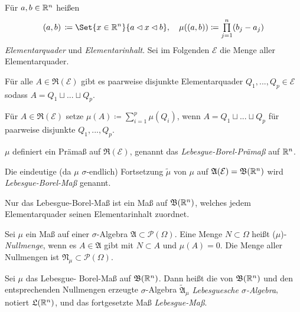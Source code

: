 \documentclass{cheat-sheet}
\newcommand{\PS}{\mathcal{P}} %
\newcommand{\PSO}{\PS(\Omega)} %
\newcommand{\Alg}{\mathfrak{A}} %
\newcommand{\Ring}{\mathfrak{R}} %
\newcommand{\Bor}{\mathfrak{B}} %
\theoremstyle{definition}
\begin{document}
\begin{defn}
  Für $a, b \in \mathbb{R}^n$ heißen
  \[
    \ointerval{a}{b}\,\coloneqq \Set{ x \in \R^n }{ a \lhd x \lhd b }, \quad
    \mu(\ointerval{a}{b}) \coloneqq \prod_{j = 1}^{n} (b_j - a_j)
  \]
  \emph{Elementarquader} und \emph{Elementarinhalt}. Sei im Folgenden $\mathcal{E}$ die Menge aller Elementarquader.
\end{defn}

\begin{satz}
  Für alle $A \in \Ring(\mathcal{E})$ gibt es paarweise disjunkte Elementarquader $Q_1, ..., Q_p \in \mathcal{E}$ sodass $A = Q_1 \sqcup ... \sqcup Q_p$.
\end{satz}

\begin{defn}
  Für $A \in \Ring(\mathcal{E})$ setze $\mu(A) \coloneqq \textstyle\sum_{i = 1}^p \mu(Q_i)$, wenn $A = Q_1 \sqcup ... \sqcup Q_p$ für paarweise disjunkte $Q_1, ..., Q_p$.
\end{defn}

\begin{satz}
  $\mu$ definiert ein Prämaß auf $\Ring(\mathcal{E})$, genannt das \emph{Lebesgue-Borel-Prämaß} auf $\mathbb{R}^n$.
\end{satz}

\begin{defn}
  Die eindeutige (da $\mu$ $\sigma$-endlich) Fortsetzung $\tilde{\mu}$ von $\mu$ auf $\Alg(\mathcal{E}) = \Bor(\R^n)$ wird \emph{Lebesgue-Borel-Maß} genannt.
\end{defn}

\begin{bem}
  Nur das Lebesgue-Borel-Maß ist ein Maß auf $\Bor(\R^n)$, welches jedem Elementarquader seinen Elementarinhalt zuordnet.
\end{bem}

\begin{defn}
  Sei $\mu$ ein Maß auf einer $\sigma$-Algebra $\Alg \subset \PSO$. Eine Menge $N \subset \Omega$ heißt ($\mu$)-\emph{Nullmenge}, wenn es $A \in \Alg$ gibt mit $N \subset A$ und $\mu(A) = 0$. Die Menge aller Nullmengen ist $\mathfrak{N}_\mu \subset \PSO$.
\end{defn}

\begin{defn}
  Sei $\mu$ das Lebesgue- Borel-Maß auf $\Bor(\R^n)$. Dann heißt die von $\Bor(\R^n)$ und den ent\-sprech\-en\-den Nullmengen erzeugte $\sigma$-Algebra $\tilde{\Alg}_\mu$ \emph{Lebesguesche $\sigma$-Algebra}, notiert $\mathfrak{L}(\mathbb{R}^n)$, und das fortgesetzte Maß \emph{Lebesgue-Maß}.
\end{defn}
\end{document}
